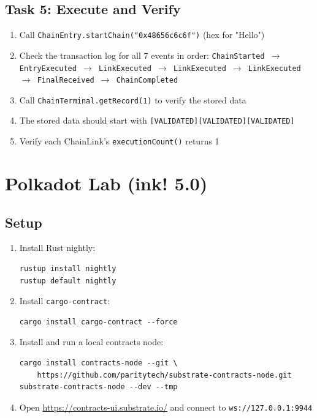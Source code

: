 \documentclass[11pt,a4paper]{article}
\begin{document}
\subsection{Task 5: Execute and Verify}

\begin{enumerate}
    \item Call \texttt{ChainEntry.startChain("0x48656c6c6f")} (hex for "Hello")
    \item Check the transaction log for all 7 events in order:
          \texttt{ChainStarted $\to$ EntryExecuted $\to$ LinkExecuted $\to$ LinkExecuted $\to$ LinkExecuted $\to$ FinalReceived $\to$ ChainCompleted}
    \item Call \texttt{ChainTerminal.getRecord(1)} to verify the stored data
    \item The stored data should start with \texttt{[VALIDATED][VALIDATED][VALIDATED]}
    \item Verify each ChainLink's \texttt{executionCount()} returns 1
\end{enumerate}

\section{Polkadot Lab (ink! 5.0)}

\subsection{Setup}

\begin{enumerate}
    \item Install Rust nightly:
    \begin{verbatim}
rustup install nightly
rustup default nightly
\end{verbatim}
    \item Install \texttt{cargo-contract}:
    \begin{verbatim}
cargo install cargo-contract --force
\end{verbatim}
    \item Install and run a local contracts node:
    \begin{verbatim}
cargo install contracts-node --git \
    https://github.com/paritytech/substrate-contracts-node.git
substrate-contracts-node --dev --tmp
\end{verbatim}
    \item Open \url{https://contracts-ui.substrate.io/} and connect to
          \texttt{ws://127.0.0.1:9944}
\end{enumerate}
\end{document}
